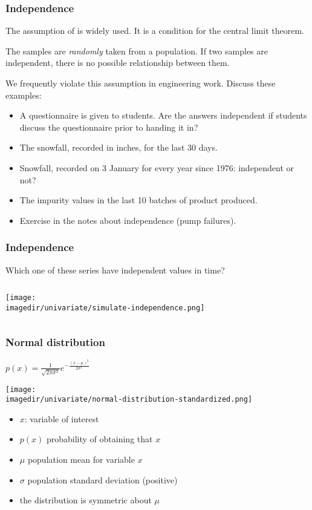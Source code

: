 \begin{frame}\frametitle{Independence}

	The assumption of {\color{purple}{independence}} is widely used. It is a condition for the central limit theorem.
	\begin{block}
		{\color{purple}{Independence}}
		\begin{center}
			The samples are \emph{randomly} taken from a population. If two samples are independent, there is no possible relationship between them.
		\end{center}
	\end{block}

	We frequently violate this assumption in engineering work. Discuss these examples:
	\begin{itemize}
		\item	A questionnaire is given to students. Are the answers independent if students discuss the questionnaire prior to handing it in?
		\item	The snowfall, recorded in inches, for the last 30 days.
		\item	Snowfall, recorded on 3 January for every year since 1976: independent or not?
		\item	The impurity values in the last 10 batches of product produced.
		\item	Exercise in the notes about independence (pump failures).
	\end{itemize}
\end{frame}

\begin{frame}\frametitle{Independence}

	Which one of these series have independent values in time?
	\begin{columns}[t]
			\texttt{[image: \\imagedir/univariate/simulate-independence.png]}
	\end{columns}
	
\end{frame}

\begin{frame}\frametitle{Normal distribution}

	$ p(x) = \displaystyle \frac{1}{\sqrt{2\pi \sigma^2}}e^{-\frac{\displaystyle (x-\mu)^2}{\displaystyle 2\sigma^2}} $
	\begin{center}
		\texttt{[image: \\imagedir/univariate/normal-distribution-standardized.png]}
	\end{center}
	\begin{itemize}
		\item	$x$: variable of interest
		\item	$p(x)$ probability of obtaining that $x$
		\item	$\mu$ population mean for variable $x$
		\item	$\sigma$ population standard deviation (positive)
		\item	the distribution is symmetric about $\mu$
	\end{itemize}
\end{frame}

